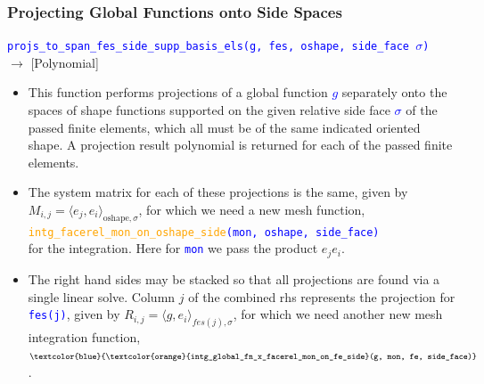 \documentclass[compress]{beamer}
\begin{document}
\begin{frame}
  \frametitle{Projecting Global Functions onto Side Spaces}
  {\small \texttt{\textcolor{blue}{projs\_to\_span\_fes\_side\_supp\_basis\_els({\scriptsize g, fes, oshape, side\_face $\sigma$})}}}\\
  \hspace{0.5cm} $\rightarrow$ [Polynomial]\\
  \pause
  \begin{itemize}[<+->]
    \item This function performs projections of a global function \textcolor{blue}{$g$} separately onto the spaces of shape functions
      supported on the given relative side face \textcolor{blue}{$\sigma$} of the passed finite elements, which all must be of the
      same indicated oriented shape.  A projection result polynomial is returned for each of the passed finite elements.
    \item The system matrix for each of these projections is the same, given by
      $M_{i,j} = \langle e_j, e_i \rangle_{\text{oshape},\sigma}$, for which we need a new mesh function,\\
      \texttt{\small \textcolor{blue}{\textcolor{orange}{intg\_facerel\_mon\_on\_oshape\_side}(mon, oshape, side\_face)}}\\
      for the integration. Here for \texttt{\textcolor{blue}{mon}} we pass the product $e_j e_i$.
    \item The right hand sides may be stacked so that all projections are found via a single linear solve.
      Column $j$ of the combined rhs represents the projection for \texttt{\textcolor{blue}{fes(j)}}, given by
      $R_{i,j} = \langle g, e_i\rangle_{fes(j),\sigma}$, for which we need another new mesh integration function,
      $\texttt{\small \textcolor{blue}{\textcolor{orange}{intg\_global\_fn\_x\_facerel\_mon\_on\_fe\_side}(g, mon, fe, side\_face)}}$.
  \end{itemize} 
\end{frame}
\end{document}
